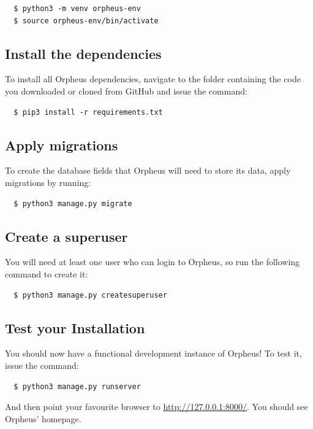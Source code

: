 \documentclass[british, 12pt]{article}
\begin{document}
\begin{lstlisting}
  $ python3 -m venv orpheus-env
  $ source orpheus-env/bin/activate
\end{lstlisting}

\subsection{Install the dependencies}

To install all Orpheus dependencies, navigate to the folder containing the code you downloaded or cloned from GitHub and issue the command:

 \begin{lstlisting}
  $ pip3 install -r requirements.txt
 \end{lstlisting}

\subsection{Apply migrations}

To create the database fields that Orpheus will need to store its data, apply migrations by running:

 \begin{lstlisting}
  $ python3 manage.py migrate
 \end{lstlisting}

\subsection{Create a superuser}

You will need at least one user who can login to Orpheus, so run the following command to create it:

 \begin{lstlisting}
  $ python3 manage.py createsuperuser
 \end{lstlisting} 
 
\subsection{Test your Installation}

You should now have a functional development instance of Orpheus! To test it, issue the command:

\begin{lstlisting}
  $ python3 manage.py runserver
 \end{lstlisting}
 
And then point your favourite browser to \url{http://127.0.0.1:8000/}. You should see Orpheus' homepage.
\end{document}
